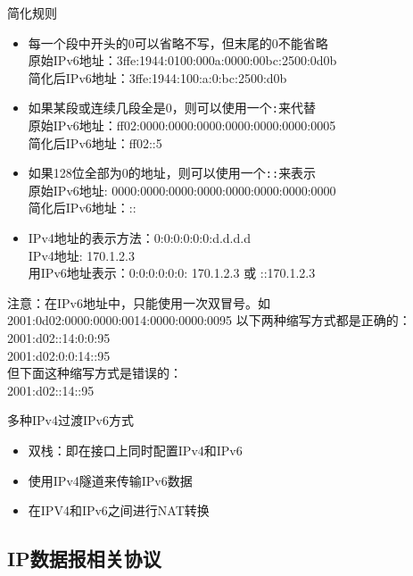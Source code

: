 简化规则
\begin{itemize}
\item 每一个段中开头的0可以省略不写，但末尾的0不能省略\\
原始IPv6地址：3ffe:1944:0100:000a:0000:00bc:2500:0d0b\\
简化后IPv6地址：3ffe:1944:100:a:0:bc:2500:d0b\\
\item 如果某段或连续几段全是0，则可以使用一个\verb':'来代替\\
原始IPv6地址：ff02:0000:0000:0000:0000:0000:0000:0005\\
简化后IPv6地址：ff02::5
\item 如果128位全部为0的地址，则可以使用一个\verb'::'来表示\\
原始IPv6地址: 0000:0000:0000:0000:0000:0000:0000:0000\\
简化后IPv6地址：::
\item IPv4地址的表示方法：0:0:0:0:0:0:d.d.d.d\\
IPv4地址: 170.1.2.3\\
用IPv6地址表示：0:0:0:0:0:0: 170.1.2.3 或 ::170.1.2.3
\end{itemize}
注意：在IPv6地址中，只能使用一次双冒号。如2001:0d02:0000:0000:0014:0000:0000:0095
以下两种缩写方式都是正确的：\\
2001:d02::14:0:0:95\\
2001:d02:0:0:14::95\\
但下面这种缩写方式是错误的：\\
2001:d02::14::95

多种IPv4过渡IPv6方式
\begin{itemize}
\item 双栈：即在接口上同时配置IPv4和IPv6
\item 使用IPv4隧道来传输IPv6数据
\item 在IPV4和IPv6之间进行NAT转换
\end{itemize}

\subsection{IP数据报相关协议}
